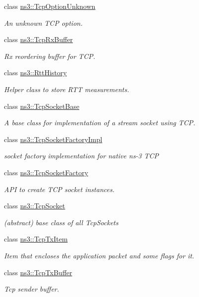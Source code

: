 \begin{DoxyCompactItemize}
class \hyperlink{classns3_1_1TcpOptionUnknown}{ns3\+::\+Tcp\+Option\+Unknown}
\begin{DoxyCompactList}\small\item\em An unknown T\+CP option. \end{DoxyCompactList}\item 
class \hyperlink{classns3_1_1TcpRxBuffer}{ns3\+::\+Tcp\+Rx\+Buffer}
\begin{DoxyCompactList}\small\item\em Rx reordering buffer for T\+CP. \end{DoxyCompactList}\item 
class \hyperlink{classns3_1_1RttHistory}{ns3\+::\+Rtt\+History}
\begin{DoxyCompactList}\small\item\em Helper class to store R\+TT measurements. \end{DoxyCompactList}\item 
class \hyperlink{classns3_1_1TcpSocketBase}{ns3\+::\+Tcp\+Socket\+Base}
\begin{DoxyCompactList}\small\item\em A base class for implementation of a stream socket using T\+CP. \end{DoxyCompactList}\item 
class \hyperlink{classns3_1_1TcpSocketFactoryImpl}{ns3\+::\+Tcp\+Socket\+Factory\+Impl}
\begin{DoxyCompactList}\small\item\em socket factory implementation for native ns-\/3 T\+CP \end{DoxyCompactList}\item 
class \hyperlink{classns3_1_1TcpSocketFactory}{ns3\+::\+Tcp\+Socket\+Factory}
\begin{DoxyCompactList}\small\item\em A\+PI to create T\+CP socket instances. \end{DoxyCompactList}\item 
class \hyperlink{classns3_1_1TcpSocket}{ns3\+::\+Tcp\+Socket}
\begin{DoxyCompactList}\small\item\em (abstract) base class of all Tcp\+Sockets \end{DoxyCompactList}\item 
class \hyperlink{classns3_1_1TcpTxItem}{ns3\+::\+Tcp\+Tx\+Item}
\begin{DoxyCompactList}\small\item\em Item that encloses the application packet and some flags for it. \end{DoxyCompactList}\item 
class \hyperlink{classns3_1_1TcpTxBuffer}{ns3\+::\+Tcp\+Tx\+Buffer}
\begin{DoxyCompactList}\small\item\em Tcp sender buffer. \end{DoxyCompactList}\end{DoxyCompactItemize}
